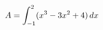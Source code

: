 \documentclass[preview]{standalone}
\begin{document}
\begin{align*}
\special{dvisvgm:raw <g id='unique000'>}A=\int_{-1}^{2}(x^3-3x^2+4)\,dx\special{dvisvgm:raw </g>}
\end{align*}
\end{document}
